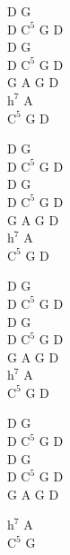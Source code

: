 \begin{chord}
    \small{
    D G\\
    D $\mathrm{C^5}$ G D\\
    D G\\
    D $\mathrm{C^5}$ G D\\
    G A G D\\
    $\mathrm{h^7}$ A\\
    $\mathrm{C^5}$ G D

    D G\\
    D $\mathrm{C^5}$ G D\\
    D G\\
    D $\mathrm{C^5}$ G D\\
    G A G D\\
    $\mathrm{h^7}$ A\\
    $\mathrm{C^5}$ G D

    D G\\
    D $\mathrm{C^5}$ G D\\
    D G\\
    D $\mathrm{C^5}$ G D\\
    G A G D\\
    $\mathrm{h^7}$ A\\
    $\mathrm{C^5}$ G D

    D G\\
    D $\mathrm{C^5}$ G D\\
    D G\\
    D $\mathrm{C^5}$ G D\\
    G A G D

    $\mathrm{h^7}$ A\\
    $\mathrm{C^5}$ G
    }
\end{chord}
